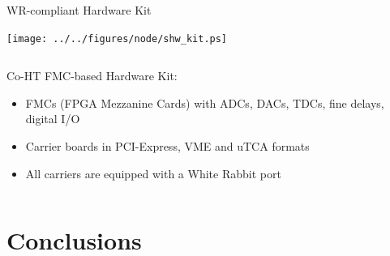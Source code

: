 \documentclass[compress,red]{beamer}
\begin{document}
\begin{frame}{WR-compliant Hardware Kit}

    \begin{center}
    \texttt{[image: ../../figures/node/shw\_kit.ps]}
    \end{center}

  \begin{columns}[c]

	\begin{block}{Co-HT FMC-based Hardware Kit:}
	  \begin{itemize}
	  \item FMCs (FPGA Mezzanine Cards) with ADCs, DACs, TDCs, fine delays, digital I/O
	  \item Carrier boards in PCI-Express, VME and uTCA formats
	  \item All carriers are equipped with a White Rabbit port
	  \end{itemize}
	\end{block}

  \end{columns}


\end{frame}
\section{Conclusions}
\end{document}
